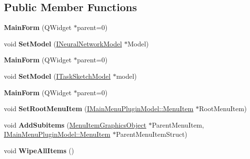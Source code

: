 \subsection*{Public Member Functions}
\begin{DoxyCompactItemize}
\item 
\mbox{\label{class_main_form_a8407ed1ab0a7b7bef115711157c8f344}} 
{\bfseries Main\+Form} (Q\+Widget $\ast$parent=0)
\item 
\mbox{\label{class_main_form_a69da72ae01b90a41559c050e81020135}} 
void {\bfseries Set\+Model} (\hyperlink{class_i_neural_network_model}{I\+Neural\+Network\+Model} $\ast$Model)
\item 
\mbox{\label{class_main_form_a8407ed1ab0a7b7bef115711157c8f344}} 
{\bfseries Main\+Form} (Q\+Widget $\ast$parent=0)
\item 
\mbox{\label{class_main_form_a4d6783977b0be48e1523fd03d836e64b}} 
void {\bfseries Set\+Model} (\hyperlink{class_i_task_sketch_model}{I\+Task\+Sketch\+Model} $\ast$model)
\item 
\mbox{\label{class_main_form_a8407ed1ab0a7b7bef115711157c8f344}} 
{\bfseries Main\+Form} (Q\+Widget $\ast$parent=0)
\item 
\mbox{\label{class_main_form_a6d1caba5273f012fa93e93bc5b259e16}} 
void {\bfseries Set\+Root\+Menu\+Item} (\hyperlink{struct_i_main_menu_plugin_model_1_1_menu_item}{I\+Main\+Menu\+Plugin\+Model\+::\+Menu\+Item} $\ast$Root\+Menu\+Item)
\item 
\mbox{\label{class_main_form_aab382edeb9cf6c08dd2773f63268ea3d}} 
void {\bfseries Add\+Subitems} (\hyperlink{class_menu_item_graphics_object}{Menu\+Item\+Graphics\+Object} $\ast$Parent\+Menu\+Item, \hyperlink{struct_i_main_menu_plugin_model_1_1_menu_item}{I\+Main\+Menu\+Plugin\+Model\+::\+Menu\+Item} $\ast$Parent\+Menu\+Item\+Struct)
\item 
\mbox{\label{class_main_form_a27f6000033cf622a9629b82927055c95}} 
void {\bfseries Wipe\+All\+Items} ()
\item 
\mbox{\label{class_main_form_a8407ed1ab0a7b7bef115711157c8f344}} 

\end{DoxyCompactItemize}
